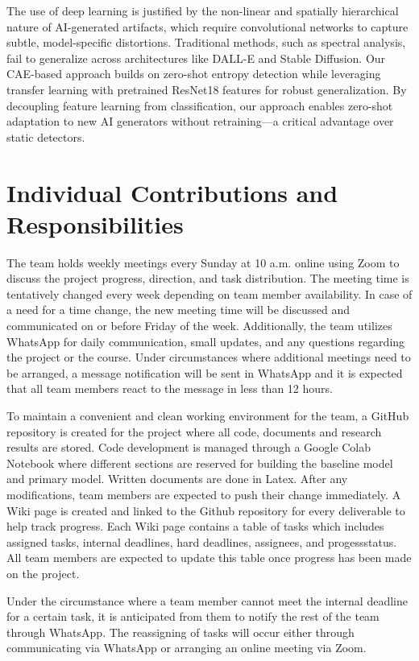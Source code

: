 \documentclass{article} %
\begin{document}
The use of deep learning is justified by the non-linear and spatially hierarchical nature of AI-generated artifacts, which require convolutional networks to capture subtle, model-specific distortions. Traditional methods, such as spectral analysis, fail to generalize across architectures like DALL-E and Stable Diffusion. Our CAE-based approach builds on zero-shot entropy detection while leveraging transfer learning with pretrained ResNet18 features for robust generalization. By decoupling feature learning from classification, our approach enables zero-shot adaptation to new AI generators without retraining—a critical advantage over static detectors.

\section{Individual Contributions and Responsibilities}

The team holds weekly meetings every Sunday at 10 a.m. online using Zoom to discuss the project progress, direction, and task distribution. The meeting time is tentatively changed every week depending on team member availability. In case of a need for a time change, the new meeting time will be discussed and communicated on or before Friday of the week. Additionally, the team utilizes WhatsApp for daily communication, small updates, and any questions regarding the project or the course. Under circumstances where additional meetings need to be arranged, a message notification will be sent in WhatsApp and it is expected that all team members react to the message in less than 12 hours.

To maintain a convenient and clean working environment for the team, a GitHub repository is created for the project where all code, documents and research results are stored. Code development is managed through a Google Colab Notebook where different sections are reserved for building the baseline model and primary model. Written documents are done in Latex. After any modifications, team members are expected to push their change immediately. A Wiki page is created and linked to the Github repository for every deliverable to help track progress. Each Wiki page contains a table of tasks which includes assigned tasks, internal deadlines, hard deadlines, assignees, and progessstatus. All team members are expected to update this table once progress has been made on the project. 

Under the circumstance where a team member cannot meet the internal deadline for a certain task, it is anticipated from them to notify the rest of the team through WhatsApp. The reassigning of tasks will occur either through communicating via WhatsApp or arranging an online meeting via Zoom.
\end{document}
